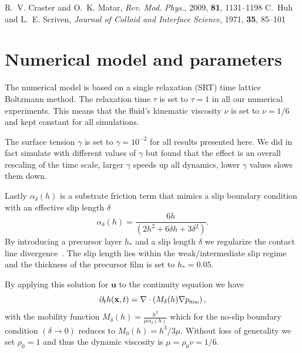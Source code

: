 \documentclass[twoside,twocolumn,9pt]{article}
\begin{document}
\begin{mcitethebibliography}{38}
\mciteBstWouldAddEndPuncttrue
\mciteSetBstMidEndSepPunct{\mcitedefaultmidpunct}
{\mcitedefaultendpunct}{\mcitedefaultseppunct}\relax
\EndOfBibitem
{}
R.~V. Craster and O.~K. Matar, \emph{Rev. Mod. Phys.}, 2009, \textbf{81}, 1131--1198\relax
\mciteBstWouldAddEndPuncttrue
\mciteSetBstMidEndSepPunct{\mcitedefaultmidpunct}
{\mcitedefaultendpunct}{\mcitedefaultseppunct}\relax
\EndOfBibitem
{}
C.~Huh and L.~E. Scriven, \emph{Journal of Colloid and Interface Science}, 1971, \textbf{35}, 85--101\relax
\mciteBstWouldAddEndPuncttrue
\mciteSetBstMidEndSepPunct{\mcitedefaultmidpunct}
{\mcitedefaultendpunct}{\mcitedefaultseppunct}\relax
\EndOfBibitem
\end{mcitethebibliography}


\appendix
\section{Numerical model and parameters}\label{app:numerics}
The numerical model is based on a single relaxation (SRT) time lattice Boltzmann method. 
The relaxation time $\tau$ is set to $\tau = 1$ in all our numerical experiments. 
This means that the fluid's kinematic viscosity $\nu$ is set to $\nu = 1/6$ and kept constant for all simulations.  

The surface tension $\gamma$ is set to $\gamma = 10^{-2}$ for all results presented here.
We did in fact simulate with different values of $\gamma$ but found that the effect is an overall rescaling of the time scale, larger $\gamma$ speeds up all dynamics, lower $\gamma$ values slows them down.

Lastly $\alpha_{\delta}(h)$ is a substrate friction term that mimics a slip boundary condition with an effective slip length $\delta$
\begin{equation}\label{eq:alphafric_app}
\alpha_{\delta}(h) = \frac{6h}{(2 h^2 + 6 \delta h + 3 \delta^2)}.
\end{equation}
By introducing a precursor layer $h_{\ast}$ and a slip length $\delta$ we regularize the contact line divergence~\cite{huhHydrodynamicModelSteady1971}. 
The slip length lies within the weak/intermediate slip regime~\cite{peschkaSignaturesSlipDewetting2019,fetzerQuantifyingHydrodynamicSlip2007, munchLubricationModelsSmall2005} and the thickness of the precursor film is set to $h_{\ast} = 0.05$.

By applying this solution for $\mathbf{u}$ to the continuity equation we have
\begin{equation}\label{eq:thinsolve_app}
     \partial_t h(\mathbf{x},t) = \nabla\cdot\left(M_{\delta}(h)\nabla p_{\mbox{\tiny{film}}}\right),
\end{equation}
with the mobility function $M_{\delta}(h) = \frac{h^2}{\mu\alpha_{\delta}(h)}$ which for the no-slip boundary condition $(\delta \rightarrow 0)$ reduces to $M_{0}(h) = h^3/3\mu$.
Without loss of generality we set $\rho_0 = 1$ and thus the dynamic viscosity is $\mu = \rho_0 \nu = 1/6$. 
\end{document}

